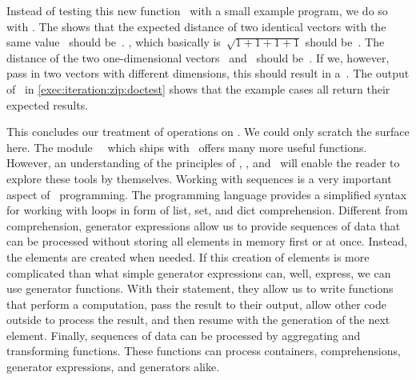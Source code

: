 Instead of testing this new function~ with a small example program, we do so with .
The  shows that the expected distance of two identical vectors with the same value~\pythonil{[1, 1]} should be~.
, which basically is~$\sqrt{1 + 1 + 1 + 1}$ should be~.
The distance of the two one-dimensional vectors~\pythonil{[100]} and~\pythonil{[10]} should be~.
If we, however, pass in two vectors with different dimensions, this should result in a~.
The output of \pytest\ in \cref{exec:iteration:zip:doctest} shows that the example cases all return their expected results.

This concludes our treatment of operations on .
We could only scratch the surface here.
The module~~\cite{PSF:P3D:TPSL:IFCIFEL} which ships with \python\ offers many more useful functions.
However, an understanding of the principles of , , and~ will enable the reader to explore these tools by themselves.%
\FloatBarrier%
\endhsection%
%
%
%
Working with sequences is a very important aspect of \python\ programming.
The programming language provides a simplified syntax for working with loops in form of list, set, and dict comprehension.
Different from comprehension, generator expressions allow us to provide sequences of data that can be processed without storing all elements in memory first or at once.
Instead, the elements are created when needed.
If this creation of elements is more complicated than what simple generator expressions can, well, express, we can use generator functions.
With their  statement, they allow us to write functions that perform a computation, pass the result to their output, allow other code outside to process the result, and then resume with the generation of the next element.
Finally, sequences of data can be processed by aggregating and transforming functions.
These functions can process containers, comprehensions, generator expressions, and generators alike.%
\endhsection%
%
\endhsection%
%
